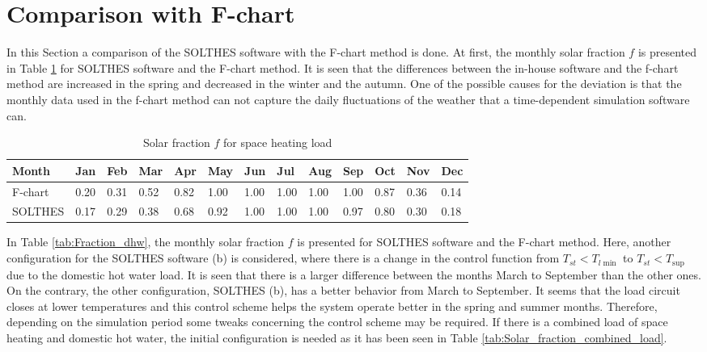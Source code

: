 \documentclass{article}
\begin{document}
\section{Comparison with F-chart}
In this Section a comparison of the SOLTHES software with the F-chart method is done. At first, the monthly solar fraction $f$ is presented in Table \ref{tab:Fraction_heat} for SOLTHES software and the F-chart method. It is seen that the differences between the in-house software and the f-chart method are increased in the spring and decreased in the winter and the autumn. One of the possible causes for the deviation is that the monthly data used in the f-chart method can not capture the daily fluctuations of the weather that a time-dependent simulation software can.    


\begin{table}
\centering
\caption{\label{tab:Fraction_heat} Solar fraction $f$ for space heating load}
\begin{tabular}{|l|l|l|l|l|l|l|l|l|l|l|l|l|}
\hline
Month & Jan & Feb & Mar & Apr & May & Jun & Jul & Aug & Sep & Oct & Nov & Dec \\\hline
F-chart & 0.20 & 0.31 & 0.52 & 0.82 & 1.00 & 1.00 & 1.00 & 1.00 & 1.00 & 0.87 & 0.36 & 0.14  \\\hline
SOLTHES & 0.17 & 0.29 & 0.38 & 0.68 & 0.92 &	1.00 & 1.00 & 1.00 & 0.97 & 0.80 & 0.30 & 0.18  \\\hline
\end{tabular}
\end{table}

In Table \ref{tab:Fraction_dhw}, the monthly solar fraction $f$ is presented for SOLTHES software and the F-chart method. Here, another configuration for the SOLTHES software (b) is considered, where there is a change in the control function from ${{T}_{st}}<{{T}_{l\min }}$ to  ${{T}_{st}}<{{T}_{\sup }}$ due to the domestic hot water load. It is seen that there is a larger difference between the months March to September than the other ones. On the contrary, the other configuration, SOLTHES (b), has a better behavior from March to September. It seems that the load circuit closes at lower temperatures and this control scheme helps the system operate better in the spring and summer months. Therefore, depending on the simulation period some tweaks concerning the control scheme may be required. If there is a combined load of space heating and domestic hot water, the initial configuration is needed as it has been seen in Table \ref{tab:Solar_fraction_combined_load}.
\end{document}
